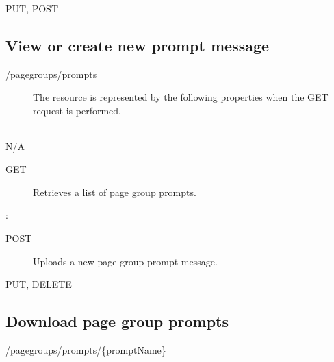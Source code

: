 \documentclass[letterpaper,10pt,english]{sphinxmanual}
\begin{document}
 PUT, POST


\subsection{View or create new prompt message}
\label{\detokenize{restapi:view-or-create-new-prompt-message}}
 /pagegroups/prompts
\begin{description}
\item[{}] \leavevmode
The resource is represented by the following properties when the GET request is performed.

\end{description}


\begin{savenotes}\sphinxattablestart
\centering
\begin{tabulary}{\linewidth}[t]{|T|T|}
\hline

&
\\
\hline
\end{tabulary}
\par
\sphinxattableend\end{savenotes}

 N/A
\begin{description}
\item[{ GET}] \leavevmode
Retrieves a list of page group prompts.

\end{description}

:

\begin{sphinxVerbatim}[commandchars=\\\{\}]
\end{sphinxVerbatim}
\begin{description}
\item[{ POST}] \leavevmode
Uploads a new page group prompt message.

\end{description}

 PUT, DELETE


\subsection{Download page group prompts}
\label{\detokenize{restapi:download-page-group-prompts}}
 /pagegroups/prompts/\{promptName\}
\end{document}
